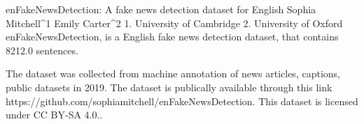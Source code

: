 
enFakeNewsDetection: A fake news detection dataset for English
Sophia Mitchell^1 Emily Carter^2
1. University of Cambridge 2. University of Oxford
enFakeNewsDetection, is a English fake news detection dataset, that contains 8212.0 sentences.

The dataset was collected from machine annotation of news articles, captions, public datasets in 2019. 
The dataset is publically available through this link https://github.com/sophiamitchell/enFakeNewsDetection. This dataset is licensed under CC BY-SA 4.0..

